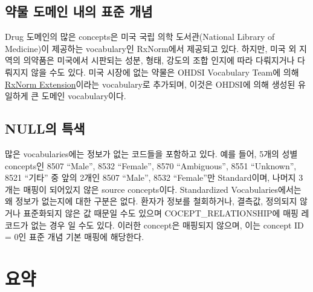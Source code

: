\documentclass[11pt]{book}
\theoremstyle{definition}
\theoremstyle{definition}
\theoremstyle{definition}
\theoremstyle{remark}
\begin{document}
\subsection{약물 도메인 내의 표준 개념}\label{rxNormExtension}

Drug 도메인의 많은 concepts은 미국 국립 의학 도서관(National Library of
Medicine)이 제공하는 vocabulary인 RxNorm에서 제공되고 있다. 하지만, 미국
외 지역의 의약품은 미국에서 시판되는 성분, 형태, 강도의 조합 인지에 따라
다뤄지거나 다뤄지지 않을 수도 있다. 미국 시장에 없는 약물은 OHDSI
Vocabulary Team에 의해
\href{https://www.ohdsi.org/web/wiki/doku.php?id=documentation:vocabulary:rxnorm_extension}{RxNorm
Extension}이라는 vocabulary로 추가되며, 이것은 OHDSI에 의해 생성된
유일하게 큰 도메인 vocabulary이다.

\subsection{NULL의 특색}\label{null-}

많은 vocabularies에는 정보가 없는 코드들을 포함하고 있다. 예를 들어,
5개의 성별 concepts인 8507 ``Male'', 8532 ``Female'', 8570
``Ambiguous'', 8551 ``Unknown'', 8521 ``기타'' 중 앞의 2개인 8507
``Male'', 8532 ``Female''만 Standard이며, 나머지 3개는 매핑이 되어있지
않은 source concepts이다. Standardized Vocabularies에서는 왜 정보가
없는지에 대한 구분은 없다. 환자가 정보를 철회하거나, 결측값, 정의되지
않거나 표준화되지 않은 값 때문일 수도 있으며 COCEPT\_RELATIONSHIP에 매핑
레코드가 없는 경우 일 수도 있다. 이러한 concept은 매핑되지 않으며, 이는
concept ID = 0인 표준 개념 기본 매핑에 해당한다.

\section{요약}\label{-3}
\end{document}
